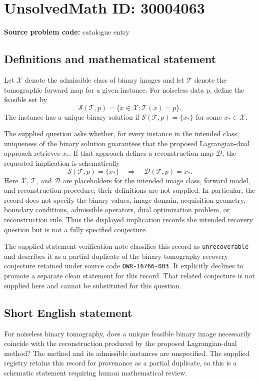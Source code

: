 \documentclass[11pt]{article}
\begin{document}
\section*{UnsolvedMath ID: 30004063}
\textbf{Source problem code:} catalogue entry
\subsection{Definitions and mathematical statement}
Let \(\mathcal X\) denote the admissible class of binary images and let \(\mathcal T\) denote the tomographic forward map for a given instance. For noiseless data \(p\), define the feasible set by
\[
\mathcal S(\mathcal T,p)=\{x\in\mathcal X:\mathcal T(x)=p\}.
\]
The instance has a unique binary solution if \(\mathcal S(\mathcal T,p)=\{x_\ast\}\) for some \(x_\ast\in\mathcal X\).

The supplied question asks whether, for every instance in the intended class, uniqueness of the binary solution guarantees that the proposed Lagrangian-dual approach retrieves \(x_\ast\). If that approach defines a reconstruction map \(\mathcal D\), the requested implication is schematically
\[
\mathcal S(\mathcal T,p)=\{x_\ast\}
\quad\Longrightarrow\quad
\mathcal D(\mathcal T,p)=x_\ast.
\]
Here \(\mathcal X\), \(\mathcal T\), and \(\mathcal D\) are placeholders for the intended image class, forward model, and reconstruction procedure; their definitions are not supplied. In particular, the record does not specify the binary values, image domain, acquisition geometry, boundary conditions, admissible operators, dual optimization problem, or reconstruction rule. Thus the displayed implication records the intended recovery question but is not a fully specified conjecture.

The supplied statement-verification note classifies this record as \texttt{unrecoverable} and describes it as a partial duplicate of the binary-tomography recovery conjecture retained under source code \texttt{OWR-16766-003}. It explicitly declines to promote a separate clean statement for this record. That related conjecture is not supplied here and cannot be substituted for this question.
\subsection{Short English statement}
For noiseless binary tomography, does a unique feasible binary image necessarily coincide with the reconstruction produced by the proposed Lagrangian-dual method? The method and its admissible instances are unspecified. The supplied registry retains this record for provenance as a partial duplicate, so this is a schematic statement requiring human mathematical review.
\end{document}
